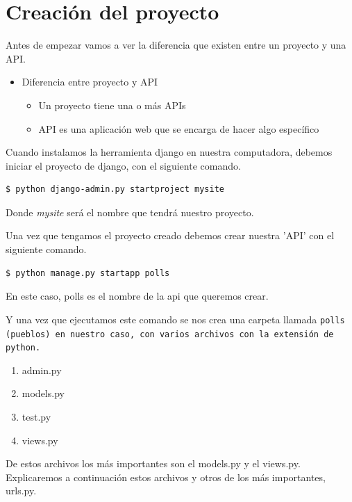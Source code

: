 \section{Creación del proyecto} {
Antes de empezar vamos a ver la diferencia que existen entre un proyecto y una API.

\begin{itemize}
	\item Diferencia entre proyecto y API
	\begin{itemize}
		\item Un proyecto tiene una o más APIs
		\item API es una aplicación web que se encarga de hacer algo específico 
	\end{itemize}
\end{itemize}
	

Cuando instalamos la herramienta django en nuestra computadora, debemos iniciar el proyecto de django, con el siguiente comando.

\begin{lstlisting}
$ python django-admin.py startproject mysite
\end{lstlisting}

Donde \textit{mysite} será el nombre que tendrá nuestro proyecto.

Una vez que tengamos el proyecto creado debemos crear nuestra 'API' con el siguiente comando.

\begin{lstlisting}
$ python manage.py startapp polls
\end{lstlisting}

En este caso, polls es el nombre de la api que queremos crear.

Y una vez que ejecutamos este comando se nos crea una carpeta llamada \tt{polls} (pueblos) en nuestro caso, con varios archivos con la extensión de python.

\begin{enumerate}

	\item{admin.py}
	\item{models.py}
	\item{test.py}
	\item{views.py}

\end{enumerate}
 
	De estos archivos los más importantes son el models.py y el views.py. Explicaremos a continuación estos archivos y otros de los más importantes, urls.py.
}



